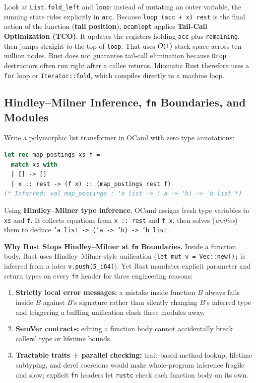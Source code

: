 Look at \texttt{List.fold\_left} and \texttt{loop}: instead of mutating an outer variable, the running state rides explicitly in \texttt{acc}. Because \texttt{loop (acc + x) rest} is the final action of the function (\textbf{tail position}), \texttt{ocamlopt} applies \textbf{Tail-Call Optimization (TCO)}. It updates the registers holding \texttt{acc} plus \texttt{remaining}, then jumps straight to the top of \texttt{loop}. That uses $O(1)$ stack space across ten million nodes. Rust does not guarantee tail-call elimination because \texttt{Drop} destructors often run right after a callee returns. Idiomatic Rust therefore uses a \texttt{for} loop or \texttt{Iterator::fold}, which compiles directly to a machine loop.

\subsection{Hindley--Milner Inference, \texttt{fn} Boundaries, and Modules}

Write a polymorphic list transformer in OCaml with zero type annotations:

\begin{lstlisting}[language=OCaml]
let rec map_postings xs f =
  match xs with
  | [] -> []
  | x :: rest -> (f x) :: (map_postings rest f)
(* Inferred: val map_postings : 'a list -> ('a -> 'b) -> 'b list *)
\end{lstlisting}

Using \textbf{Hindley--Milner type inference}, OCaml assigns fresh type variables to \texttt{xs} and \texttt{f}. It collects equations from \texttt{x :: rest} and \texttt{f x}, then solves (\emph{unifies}) them to deduce \texttt{'a list -> ('a -> 'b) -> 'b list}.

\begin{whybox}
\textbf{Why Rust Stops Hindley--Milner at \texttt{fn} Boundaries.}
Inside a function body, Rust uses Hindley--Milner-style unification (\texttt{let mut v = Vec::new();}
is inferred from a later \texttt{v.push(5\_i64)}). Yet Rust mandates explicit parameter
and return types on every \texttt{fn} header for three engineering reasons:
\begin{enumerate}
  \item \textbf{Strictly local error messages:} a mistake inside function $B$ always
    fails inside $B$ against $B$'s signature rather than silently changing $B$'s
    inferred type and triggering a baffling unification clash three modules away.
  \item \textbf{SemVer contracts:} editing a function body cannot accidentally break
    callers' type or lifetime bounds.
  \item \textbf{Tractable traits + parallel checking:} trait-based method lookup,
    lifetime subtyping, and deref coercions would make whole-program inference
    fragile and slow; explicit \texttt{fn} headers let \texttt{rustc} check each
    function body on its own.
\end{enumerate}
\end{whybox}

